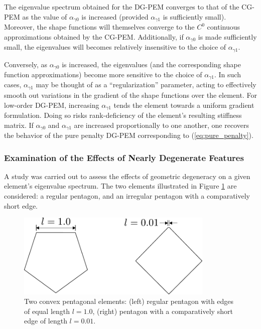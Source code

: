 The eigenvalue spectrum obtained for the DG-PEM converges to that of the CG-PEM as the value of $\alpha_{\gamma0}$ is increased (provided $\alpha_{\gamma1}$ is sufficiently small). Moreover, the shape functions will themselves converge to the $C^0$ continuous approximations obtained by the CG-PEM. Additionally, if $\alpha_{\gamma0}$ is made sufficiently small, the eigenvalues will becomes relatively insensitive to the choice of $\alpha_{\gamma1}$. 

Conversely, as $\alpha_{\gamma0}$ is increased, the eigenvalues (and the corresponding shape function approximations) become more sensitive to the choice of $\alpha_{\gamma1}$. In such cases, $\alpha_{\gamma1}$ may be thought of as a ``regularization'' parameter, acting to effectively smooth out variations in the gradient of the shape functions over the element. For low-order DG-PEM, increasing $\alpha_{\gamma1}$ tends the element towards a uniform gradient formulation. Doing so risks rank-deficiency of the element's resulting stiffness matrix. If $\alpha_{\gamma0}$ and $\alpha_{\gamma1}$ are increased proportionally to one another, one recovers the behavior of the pure penalty DG-PEM corresponding to (\ref{eq:pure_penalty}).

\subsubsection*{Examination of the Effects of Nearly Degenerate Features}

A study was carried out to assess the effects of geometric degeneracy on a given element's eigenvalue spectrum. The two elements illustrated in Figure \ref{fig:degenerate_element_shapes} are considered: a regular pentagon, and an irregular pentagon with a comparatively short edge.

\begin{figure}[!h]
  \centering
  \includegraphics[width=3.7in]{figures/degenerate_element_shapes.pdf}  \caption{Two convex pentagonal elements: (left) regular pentagon with edges of equal length $l = 1.0$, (right) pentagon with a comparatively short edge of length $l = 0.01$.}
  \label{fig:degenerate_element_shapes}
\end{figure}

